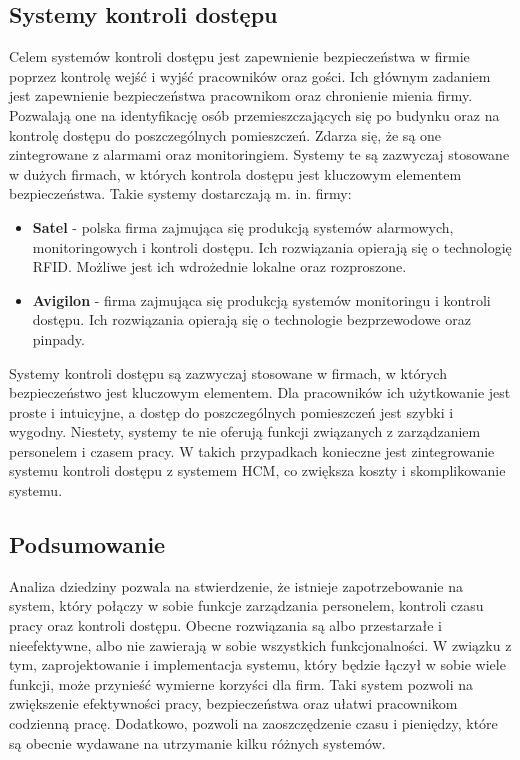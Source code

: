 \subsection{Systemy kontroli dostępu}

Celem systemów kontroli dostępu jest zapewnienie bezpieczeństwa w firmie poprzez kontrolę wejść i wyjść pracowników oraz gości. Ich głównym zadaniem jest zapewnienie bezpieczeństwa pracownikom oraz chronienie mienia firmy. Pozwalają one na identyfikację osób przemieszczających się po budynku oraz na kontrolę dostępu do poszczególnych pomieszczeń. Zdarza się, że są one zintegrowane z alarmami oraz monitoringiem. Systemy te są zazwyczaj stosowane w dużych firmach, w których kontrola dostępu jest kluczowym elementem bezpieczeństwa. Takie systemy dostarczają m. in. firmy:

\begin{itemize}
    \item \textbf{Satel} - polska firma zajmująca się produkcją systemów alarmowych, monitoringowych i kontroli dostępu. Ich rozwiązania opierają się o technologię RFID. Możliwe jest ich wdrożednie lokalne oraz rozproszone.
    \item \textbf{Avigilon} - firma zajmująca się produkcją systemów monitoringu i kontroli dostępu. Ich rozwiązania opierają się o technologie bezprzewodowe oraz pinpady.
\end{itemize}

Systemy kontroli dostępu są zazwyczaj stosowane w firmach, w których bezpieczeństwo jest kluczowym elementem. Dla pracowników ich użytkowanie jest proste i intuicyjne, a dostęp do poszczególnych pomieszczeń jest szybki i wygodny. Niestety, systemy te nie oferują funkcji związanych z zarządzaniem personelem i czasem pracy. W takich przypadkach konieczne jest zintegrowanie systemu kontroli dostępu z systemem HCM, co zwiększa koszty i skomplikowanie systemu.

\subsection{Podsumowanie}

Analiza dziedziny pozwala na stwierdzenie, że istnieje zapotrzebowanie na system, który połączy w sobie funkcje zarządzania personelem, kontroli czasu pracy oraz kontroli dostępu. Obecne rozwiązania są albo przestarzałe i nieefektywne, albo nie zawierają w sobie wszystkich funkcjonalności. W związku z tym, zaprojektowanie i implementacja systemu, który będzie łączył w sobie wiele funkcji, może przynieść wymierne korzyści dla firm. Taki system pozwoli na zwiększenie efektywności pracy, bezpieczeństwa oraz ułatwi pracownikom codzienną pracę. Dodatkowo, pozwoli na zaoszczędzenie czasu i pieniędzy, które są obecnie wydawane na utrzymanie kilku różnych systemów.

